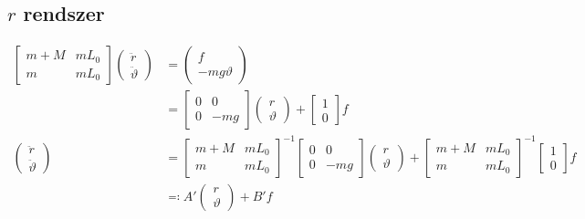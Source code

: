 \documentclass{article}
\begin{document}
	\subsection{$r$ rendszer}
		\begin{align}
			\begin{bmatrix}
				m+M & mL_0 \\
				m   & mL_0
			\end{bmatrix}
			\begin{pmatrix}
				\ddot{r} \\
				\ddot{\vartheta}
			\end{pmatrix}
			&=
			\begin{pmatrix}
				f \\
				-mg\vartheta
			\end{pmatrix} \\
			& =
			\begin{bmatrix}
				0 & 0 \\
				0 & -mg
			\end{bmatrix}
			\begin{pmatrix}
				r \\
				\vartheta
			\end{pmatrix}
			+
			\begin{bmatrix}
				1 \\
				0
			\end{bmatrix}
			f \\
			\begin{pmatrix}
				\ddot{r} \\
				\ddot{\vartheta}
			\end{pmatrix}
			& =
			\begin{bmatrix}
				m+M & mL_0 \\
				m   & mL_0
			\end{bmatrix}^{-1}
			\begin{bmatrix}
				0 & 0 \\
				0 & -mg
			\end{bmatrix}
			\begin{pmatrix}
				r \\
				\vartheta
			\end{pmatrix}
			+
			\begin{bmatrix}
				m+M & mL_0 \\
				m   & mL_0
			\end{bmatrix}^{-1}
			\begin{bmatrix}
				1 \\
				0
			\end{bmatrix}
			f \\
			& \eqqcolon
			A'
			\begin{pmatrix}
				r \\
				\vartheta
			\end{pmatrix}
			+
			B'
			f
		\end{align}
\end{document}
